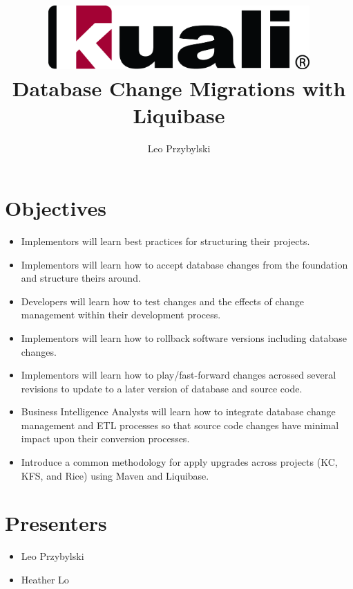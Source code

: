\documentclass[12pt,notitlepage]{article}
\author{Leo Przybylski}
\title{\includegraphics[width=0.75\textwidth]{kuali_base.png}\\Database Change Migrations with Liquibase}
\date{}
\begin{document}
\maketitle


\section{Objectives}
\begin{itemize}
\item Implementors will learn best practices for structuring their projects.
\item Implementors will learn how to accept database changes from the foundation and structure theirs around.
\item Developers will learn how to test changes and the effects of change management within their development process.
\item Implementors will learn how to rollback software versions including database changes.
\item Implementors will learn how to play/fast-forward changes acrossed several revisions to update to a later version of database and source code.
\item Business Intelligence Analysts will learn how to integrate database change management and ETL processes so that source code changes have minimal impact upon their conversion processes.
\item Introduce a common methodology for apply upgrades across projects (KC,
KFS, and Rice) using Maven and Liquibase.
\end{itemize}

\section{Presenters}
\begin{itemize}
\item Leo Przybylski
\item Heather Lo
\end{itemize}
\end{document}
